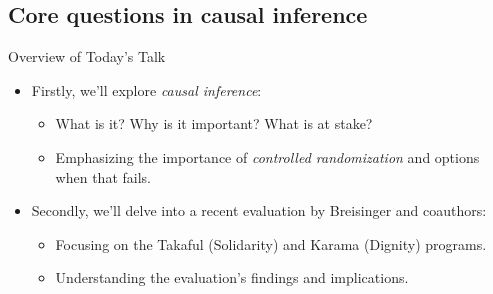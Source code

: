 \documentclass{beamer}
\begin{document}
\subsection{Core questions in causal inference}



\begin{frame}{Overview of Today's Talk}
\begin{itemize}
\item Firstly, we'll explore \emph{causal inference}: 
    \begin{itemize}
    \item What is it?  Why is it important?  What is at stake? %
    \item Emphasizing the importance of \emph{controlled randomization} and options when that fails.
    \end{itemize}
\item Secondly, we'll delve into a recent evaluation by Breisinger and coauthors:
    \begin{itemize}
    \item Focusing on the Takaful (Solidarity) and Karama (Dignity) programs.
    \item Understanding the evaluation's findings and implications.
    \end{itemize}
\end{itemize}
\end{frame}
\end{document}
